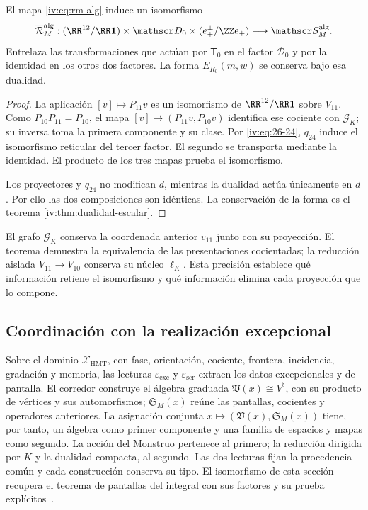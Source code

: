 \begin{theorem}
\label{iv:thm:pantallas-isomorfas}
El mapa \eqref{iv:eq:rm-alg} induce un isomorfismo
\[
 \overline{\mathcal R}_M^{\mathrm{alg}}:
 (\RR^{12}/\RR\mathbf1)\times\mathscr D_0
 \times(e_+^\perp/\ZZ e_+)
 \longrightarrow\mathscr S_M^{\mathrm{alg}}.
\]
Entrelaza las transformaciones que actúan por \(\mathsf T_0\)
en el factor \(\mathscr D_0\) y por la identidad en los
otros dos factores. La forma \(E_{R_0}(m,w)\) se conserva
bajo esa dualidad.
\end{theorem}
\begin{proof}
La aplicación \([v]\mapsto P_{11}v\) es un isomorfismo
de \(\RR^{12}/\RR\mathbf1\) sobre \(V_{11}\).
Como \(P_{10}P_{11}=P_{10}\), el mapa
\([v]\mapsto(P_{11}v,P_{10}v)\) identifica ese cociente
con \(\mathscr G_K\); su inversa toma la primera componente
y su clase. Por \eqref{iv:eq:26-24}, \(q_{24}\) induce el
isomorfismo reticular del tercer factor. El segundo se
transporta mediante la identidad. El producto de los tres
mapas prueba el isomorfismo.

Los proyectores y \(q_{24}\) no modifican \(d\), mientras
la dualidad actúa únicamente en \(d\). Por ello las dos
composiciones son idénticas. La conservación de la forma
es el teorema \ref{iv:thm:dualidad-escalar}.
\end{proof}

El grafo \(\mathscr G_K\) conserva la coordenada anterior
\(v_{11}\) junto con su proyección. El teorema demuestra
la equivalencia de las presentaciones cocientadas; la reducción
aislada \(V_{11}\to V_{10}\) conserva su núcleo
\(\ell_K\). Esta precisión establece qué información
retiene el isomorfismo y qué información elimina cada
proyección que lo compone.

\subsection{Coordinación con la realización excepcional}

Sobre el dominio \(\mathcal X_{\mathrm{HMT}}\), con fase, orientación,
cociente, frontera, incidencia, gradación y memoria, las lecturas
\(\varepsilon_{\mathrm{exc}}\) y \(\varepsilon_{\mathrm{scr}}\) extraen
los datos excepcionales y de pantalla. El corredor construye el álgebra
graduada \(\mathfrak V(x)\cong V^\natural\), con su producto de vértices
y sus automorfismos; \(\mathfrak S_M(x)\) reúne las pantallas, cocientes
y operadores anteriores. La asignación conjunta
\(x\mapsto(\mathfrak V(x),\mathfrak S_M(x))\) tiene, por tanto, un
álgebra como primer componente y una familia de espacios y mapas como segundo.
La acción del Monstruo pertenece al primero; la reducción dirigida por \(K\)
y la dualidad compacta, al segundo. Las dos lecturas fijan la procedencia
común y cada construcción conserva su tipo.
El isomorfismo de esta sección recupera el teorema de
pantallas del integral con sus factores y su prueba
explícitos~\cite{hmtedicionintegral}.
